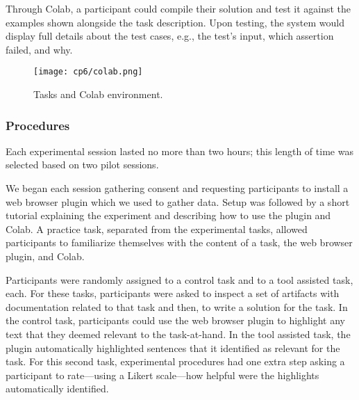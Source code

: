 {Through Colab, a participant could compile their solution and test it against the examples shown alongside the task description.
Upon testing, the system would display full details about the test cases, e.g., the test's input, which assertion failed, and why. 


 
\clearpage

\begin{landscape}
\begin{figure}
    \centering
    \texttt{[image: cp6/colab.png]}
    \caption{Tasks and Colab environment.}
    \label{fig:nytimes}
\end{figure}
\end{landscape}

\clearpage



\subsubsection{Procedures}
\label{cp6:evaluation-procedures}


Each experimental session lasted no more than two hours; this length of time was selected based on two pilot sessions. 



We began each session gathering consent and requesting participants to install a web browser plugin which we used to gather data.
Setup was followed by a short tutorial explaining the experiment and describing how to use the plugin and Colab. 
A practice task, separated from the experimental tasks,
 allowed participants to familiarize themselves with the content of a task, the web browser plugin, and Colab. 




Participants were randomly assigned to a control task and to a tool assisted task, each.
For these tasks, participants were asked to inspect a set of artifacts with documentation related to that task and then, to write a solution for the task. 
In the control task, participants could use the web browser plugin to highlight any text that they deemed relevant to the task-at-hand. 
In the tool assisted task, the plugin automatically highlighted sentences that it identified as relevant for the task. 
For this second task, experimental procedures had one extra step asking a participant to rate---using a Likert scale---how helpful were the highlights automatically identified. 




}
